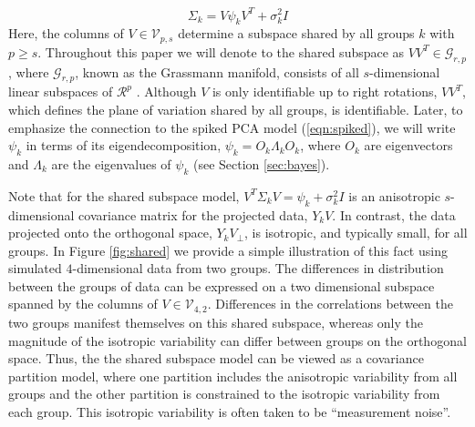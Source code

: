 \documentclass{article}
\begin{document}
\begin{equation}
\Sigma_k = V\psi_kV^T + \sigma^2_kI
\label{eqn:sspsi}
\end{equation}
%
\noindent Here, the columns of $V \in \mathcal{V}_{p, s}$ determine a subspace
shared by all groups $k$ with $p \geq s$.  Throughout this paper we
will denote to the shared subspace as $VV^T \in \mathcal G_{r,p}$, where
$\mathcal G_{r,p}$, known as the Grassmann manifold, consists of all
$s$-dimensional linear subspaces of $\mathcal{R}^p$
\citep{Chikuse2012}.  Although $V$ is only identifiable up to right
rotations, $VV^T$, which defines the plane of variation shared by all
groups, is identifiable.  Later, to emphasize the connection to the
spiked PCA model (\ref{eqn:spiked}), we will write $\psi_k$ in terms
of its eigendecomposition, $\psi_k = O_k\Lambda_kO_k$, where $O_k$ are
eigenvectors and $\Lambda_k$ are the eigenvalues of $\psi_k$ (see
Section \ref{sec:bayes}).

Note that for the shared subspace model,
$V^T\Sigma_kV = \psi_k + \sigma_k^2I$ is an anisotropic
$s$-dimensional covariance matrix for the projected data, $Y_kV$.
In contrast, the data projected onto the orthogonal space,
$Y_kV_{\perp}$, is isotropic, and typically small, for all
groups.  In Figure \ref{fig:shared} we provide a simple illustration
of this fact using simulated $4$-dimensional data from two groups.  The
differences in distribution between the groups of data can be
expressed on a two dimensional subspace spanned by the columns of
$V \in \mathcal{V}_{4, 2}$.  Differences in the correlations between
the two groups manifest themselves on this shared subspace, whereas
only the magnitude of the isotropic variability can differ between groups
on the orthogonal space.  Thus, the the shared subspace model can be
viewed as a covariance partition model, where one partition includes
the anisotropic variability from all groups and the other partition is
constrained to the isotropic variability from each group.  This
isotropic variability is often taken to be ``measurement noise''.

\end{document}
